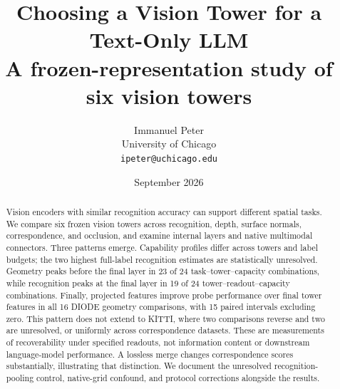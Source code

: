 \documentclass[11pt]{article}
\title{Choosing a Vision Tower for a Text-Only LLM\\
\large A frozen-representation study of six vision towers}
\author{Immanuel Peter\\University of Chicago\\\texttt{ipeter@uchicago.edu}}
\date{September 2026}
\begin{document}
\maketitle
\begin{abstract}
Vision encoders with similar recognition accuracy can support different spatial tasks.
We compare six frozen vision towers across recognition, depth, surface normals,
correspondence, and occlusion, and examine internal layers and native multimodal
connectors. Three patterns emerge. Capability profiles differ across towers and label
budgets; the two highest full-label recognition estimates are statistically unresolved.
Geometry peaks before the final layer in 23 of 24 task--tower--capacity combinations,
while recognition peaks at the final layer in 19 of 24 tower--readout--capacity combinations. Finally, projected
features improve probe performance over final tower features in all 16 DIODE geometry
comparisons, with 15 paired intervals excluding zero. This pattern does not extend to
KITTI, where two comparisons reverse and two are unresolved, or uniformly across
correspondence datasets. These are measurements of recoverability under specified
readouts, not information content or downstream language-model performance. A lossless
merge changes correspondence scores substantially, illustrating that distinction.
We document the unresolved recognition-pooling control, native-grid confound, and
protocol corrections alongside the results.
\end{abstract}







\label{page:main-end}
\clearpage


\clearpage
\appendix

\end{document}

